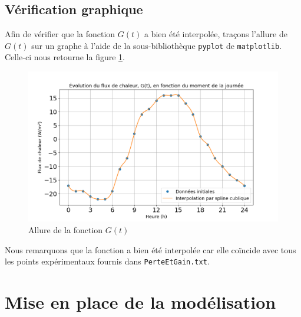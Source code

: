 \documentclass[12pt]{article}
\begin{document}
    \subsection{Vérification graphique}
        Afin de vérifier que la fonction $G(t)$ a bien été interpolée, traçons l'allure de $G(t)$ sur un graphe à l'aide de la sous-bibliothèque \texttt{pyplot} de \texttt{matplotlib}. Celle-ci nous retourne la figure \ref{fig:PerteEtGain}.
        \begin{figure}
            \centering
            \includegraphics[width=0.70
            \linewidth]{Rapport/figures/PerteEtGain.png}
            \caption{Allure de la fonction $G(t)$}
            \label{fig:PerteEtGain}
        \end{figure}
        Nous remarquons que la fonction a bien été interpolée car elle coïncide avec tous les points expérimentaux fournis dans \texttt{PerteEtGain.txt}.
        
\section{Mise en place de la modélisation}
\end{document}
